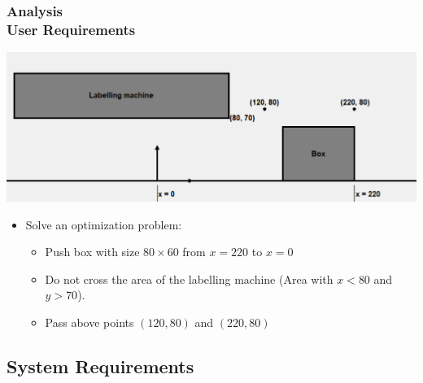 \documentclass[ucs,10pt]{beamer}
\begin{document}
\begin{frame}
\frametitle{Analysis \\
	\small \color{rwth-blue} User Requirements}
	\begin{center}
		\includegraphics[width=0.75\linewidth]{./optimization_problem.png}
	\end{center}
	\begin{itemize}
			\item Solve an optimization problem:
			\begin{itemize}
				\item Push box with size $80\times60$ from $x=220$ to $x=0$
				\item Do not cross the area of the labelling machine (Area with $x<80$ and $y>70$).
				\item Pass above points $(120, 80)$ and $(220, 80)$
			\end{itemize}
	\end{itemize}
\end{frame}


\subsection{System Requirements}
\end{document}
